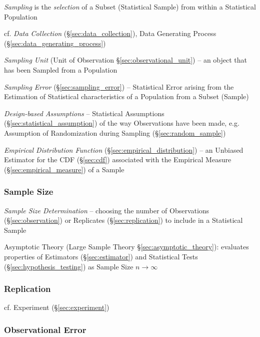 \emph{Sampling} is the \emph{selection} of a Subset (Statistical Sample) from
within a Statistical Population

\fist cf. \emph{Data Collection} (\S\ref{sec:data_collection}), Data Generating
Process (\S\ref{sec:data_generating_process})

\fist \emph{Sampling Unit} (Unit of Observation \S\ref{sec:observational_unit})
-- an object that has been Sampled from a Population

\fist \emph{Sampling Error} (\S\ref{sec:sampling_error}) -- Statistical Error
arising from the Estimation of Statistical characteristics of a Population from
a Subset (Sample)

\fist \emph{Design-based Assumptions} -- Statistical Assumptions
(\S\ref{sec:statistical_assumption}) of the way Observations have been made,
e.g. Assumption of Randomization during Sampling (\S\ref{sec:random_sample})

\emph{Empirical Distribution Function} (\S\ref{sec:empirical_distribution}) --
an Unbiased Estimator for the CDF (\S\ref{sec:cdf}) associated with the
Empirical Measure (\S\ref{sec:empirical_measure}) of a Sample



\subsubsection{Sample Size}\label{sec:sample_size}

\emph{Sample Size Determination} -- choosing the number of Observations
(\S\ref{sec:observation}) or Replicates (\S\ref{sec:replication}) to include in
a Statistical Sample

\fist Asymptotic Theory (Large Sample Theory \S\ref{sec:asymptotic_theory}):
evaluates properties of Estimators (\S\ref{sec:estimator}) and Statistical Tests
(\S\ref{sec:hypothesis_testing}) as Sample Size $n \to \infty$



\subsubsection{Replication}\label{sec:sampling_replication}


cf. Experiment (\S\ref{sec:experiment})



\subsubsection{Observational Error}\label{sec:observational_error}

